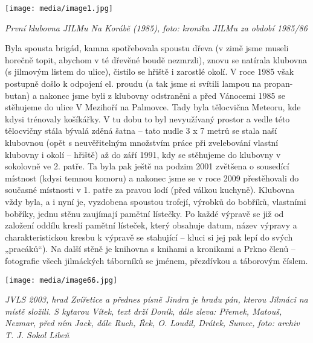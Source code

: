 \texttt{[image: media/image1.jpg]}

\emph{První klubovna JILMu Na Korábě (1985), foto: kronika JILMu za
období 1985/86}

Byla spousta brigád, kamna spotřebovala spoustu dřeva (v zimě jsme
museli horečně topit, abychom v té dřevěné boudě nezmrzli), znovu se
natírala klubovna (s jilmovým listem do ulice), čistilo se hřiště i
zarostlé okolí. V roce 1985 však postupně došlo k odpojení el. proudu (a
tak jsme si svítili lampou na propan-butan) a nakonec jsme byli z
klubovny odstraněni a před Vánocemi 1985 se stěhujeme do ulice V
Mezihoří na Palmovce. Tady byla tělocvična Meteoru, kde kdysi trénovaly
košíkářky. V tu dobu to byl nevyužívaný prostor a vedle této tělocvičny
stála bývalá zděná šatna -- tato nudle 3 x 7 metrů se stala naší
klubovnou (opět s neuvěřitelným množstvím práce při zvelebování vlastní
klubovny i okolí -- hřiště) až do září 1991, kdy se stěhujeme do
klubovny v sokolovně ve 2. patře. Ta byla pak ještě na podzim 2001
zvětšena o sousedící místnost (kdysi temnou komoru) a nakonec jsme se v
roce 2009 přestěhovali do současné místnosti v 1. patře za pravou lodí
(před válkou kuchyně). Klubovna vždy byla, a i nyní je, vyzdobena
spoustou trofejí, výrobků do bobříků, vlastními bobříky, jednu stěnu
zaujímají pamětní lístečky. Po každé výpravě se již od založení oddílu
kreslí pamětní lísteček, který obsahuje datum, název výpravy a
charakteristickou kresbu k výpravě se stahující -- kluci si jej pak lepí
do svých „pracáků``). Na další stěně je knihovna s knihami a kronikami a
Prkno členů -- fotografie všech jilmáckých táborníků se jménem,
přezdívkou a táborovým číslem.

\texttt{[image: media/image66.jpg]}

\emph{JVLS 2003, hrad Zvířetice a přednes písně Jindra je hradu pán,
kterou Jilmáci na místě složili. S kytarou Vítek, text drží Doník, dále
zleva: Přemek, Matouš, Nezmar, před ním Jack, dále Ruch, Řek, O. Loudil,
Drátek, Sumec, foto: archiv T. J. Sokol Libeň}

